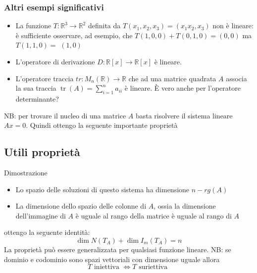 \documentclass[12pt,a4paper,oneside]{article}
\begin{document}
\subsubsection*{Altri esempi significativi}
\begin{itemize}
	\item La funzione $T: \mathbb{R}^3 \rightarrow \mathbb{R}^2$ definita da $T\left(x_1, x_2, x_3\right)=\left(x_1 x_2, x_3\right)$ non è lineare: è sufficiente osservare, ad esempio, che $T(1,0,0)+T(0,1,0)=(0,0)$ ma $T(1,1,0)=$ $(1,0)$
	\item L'operatore di derivazione $D: \mathbb{R}[x] \rightarrow \mathbb{R}[x]$ è lineare.
	\item L'operatore traccia $t r: M_n(\mathbb{R}) \rightarrow \mathbb{R}$ che ad una matrice quadrata $A$ associa la sua traccia $\operatorname{tr}(A)=\sum_{i=1}^n a_{i i}$ è lineare. È vero anche per l'operatore determinante?
\end{itemize}
NB: per trovare il nucleo di una matrice $ A $ basta risolvere il sistema lineare $ Ax=0 $. Quindi ottengo la seguente importante proprietà
\subsection{Utili proprietà}
Dimostrazione
\begin{itemize}
	\item Lo spazio delle soluzioni di questo sistema ha dimensione $ n- rg\left( A \right)  $
	\item La dimensione dello spazio delle colonne di $ A $, ossia la dimensione dell'immagine di $ A $ è uguale al rango della matrice è uguale al rango di $ A $
\end{itemize}
ottengo la seguente identità:
\[
	\dim N\left( T_A \right)  + \dim I_m \left( T_A \right) = n
\]
La proprietà può essere generalizzata per qualsiasi funzione lineare.
\vskip3mm
NB: se dominio e codominio sono spazi vettoriali con dimensione uguale allora
\[
	T \text{ iniettiva } \Leftrightarrow T \text{ suriettiva }
\]
\end{document}
